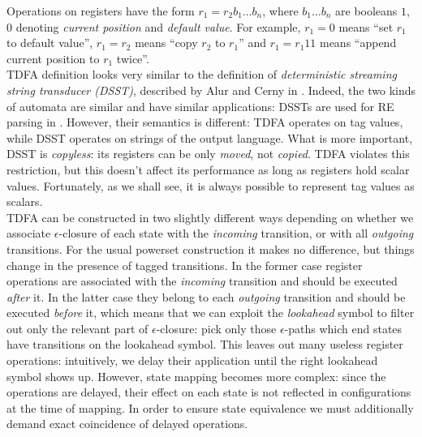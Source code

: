 \documentclass{article}
\newcommand{\Xeq}{\!=\!}
\theoremstyle{definition}
\begin{document}
\begin{multicols}{2}
Operations on registers have the form $r_1 \Xeq r_2 b_1 \dots b_n$, where $b_1 \dots b_n$ are booleans 
$1$, $0$ denoting \emph{current position} and \emph{default value}.
For example, $r_1 \Xeq 0$ means ``set $r_1$ to default value'',
$r_1 \Xeq r_2$ means ``copy $r_2$ to $r_1$'' and
$r_1 \Xeq r_1 1 1$ means ``append current position to $r_1$ twice''.
\\

TDFA definition looks very similar to the definition of
\emph{deterministic streaming string transducer (DSST)}, described by Alur and Cerny in \cite{AC11}.
Indeed, the two kinds of automata are similar and have similar applications: DSSTs are used for RE parsing in \cite{Gra15}.
However, their semantics is different: TDFA operates on tag values, while DSST operates on strings of the output language.
What is more important, DSST is \emph{copyless}:
its registers can be only \emph{moved}, not \emph{copied}.
TDFA violates this restriction, but this doesn't affect its performance as long as registers hold scalar values.
Fortunately, as we shall see, it is always possible to represent tag values as scalars.
\\

TDFA can be constructed in two slightly different ways
depending on whether we associate $\epsilon$-closure of each state with the \emph{incoming} transition,
or with all \emph{outgoing} transitions.
For the usual powerset construction it makes no difference, but things change in the presence of tagged transitions.
In the former case register operations are associated with the \emph{incoming} transition and should be executed \emph{after} it.
In the latter case they belong to each \emph{outgoing} transition and should be executed \emph{before} it,
which means that we can exploit the \emph{lookahead} symbol to filter out only the relevant part of $\epsilon$-closure:
pick only those $\epsilon$-paths which end states have transitions on the lookahead symbol.
This leaves out many useless register operations:
intuitively, we delay their application until the right lookahead symbol shows up.
However, state mapping becomes more complex:
since the operations are delayed,
their effect on each state is not reflected in configurations at the time of mapping.
In order to ensure state equivalence we must additionally demand exact coincidence of delayed operations.
\\


\end{multicols}
\end{document}
